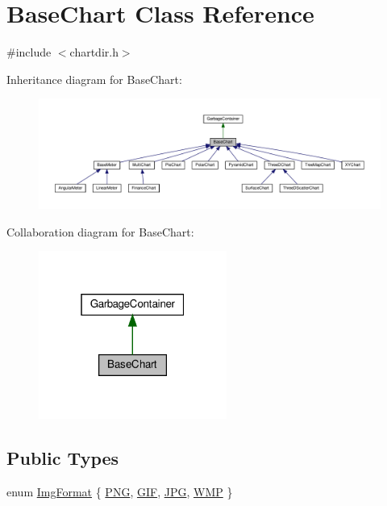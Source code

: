 \hypertarget{class_base_chart}{}\section{Base\+Chart Class Reference}
\label{class_base_chart}


{\ttfamily \#include $<$chartdir.\+h$>$}



Inheritance diagram for Base\+Chart\+:
\nopagebreak
\begin{figure}[H]
\begin{center}
\leavevmode
\includegraphics[width=350pt]{class_base_chart__inherit__graph}
\end{center}
\end{figure}


Collaboration diagram for Base\+Chart\+:
\nopagebreak
\begin{figure}[H]
\begin{center}
\leavevmode
\includegraphics[width=175pt]{class_base_chart__coll__graph}
\end{center}
\end{figure}
\subsection*{Public Types}
\begin{DoxyCompactItemize}
\item 
enum \hyperlink{class_base_chart_a04799cfecc3507923999fba7f4b50361}{Img\+Format} \{ \hyperlink{class_base_chart_a04799cfecc3507923999fba7f4b50361a1adaa6766b82d3381138508090b0fb2d}{P\+NG}, 
\hyperlink{class_base_chart_a04799cfecc3507923999fba7f4b50361abb268da0638937ac32cb4ad5e9997940}{G\+IF}, 
\hyperlink{class_base_chart_a04799cfecc3507923999fba7f4b50361ac0ecfb6586d2fddc646ba04b21f07271}{J\+PG}, 
\hyperlink{class_base_chart_a04799cfecc3507923999fba7f4b50361ae5466724378224b13e0bca7c0a1dce69}{W\+MP}
 \}
\end{DoxyCompactItemize}
